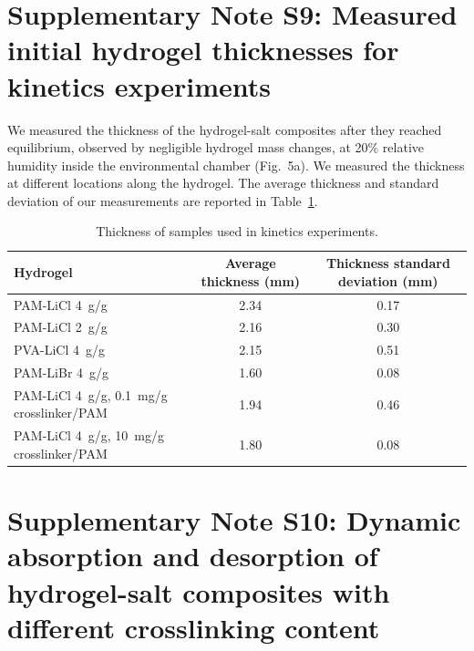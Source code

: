 \documentclass[11pt]{article}
\begin{document}
\clearpage

\section*{Supplementary Note S9: Measured initial hydrogel thicknesses for kinetics experiments}

We measured the thickness of the hydrogel-salt composites after they reached equilibrium, observed by negligible hydrogel mass changes, at 20\% relative humidity inside the environmental chamber (Fig.~5a). We measured the thickness at different locations along the hydrogel. The average thickness and standard deviation of our measurements are reported in Table~\ref{tab:S3}.

\begin{table}[htbp]
\centering
\caption{Thickness of samples used in kinetics experiments.}
\label{tab:S3}
\begin{tabular}{@{}lcc@{}}
\toprule
Hydrogel & Average thickness (mm) & Thickness standard deviation (mm) \\
\midrule
PAM-LiCl 4~g/g & 2.34 & 0.17 \\
PAM-LiCl 2~g/g & 2.16 & 0.30 \\
PVA-LiCl 4~g/g & 2.15 & 0.51 \\
PAM-LiBr 4~g/g & 1.60 & 0.08 \\
PAM-LiCl 4~g/g, 0.1~mg/g crosslinker/PAM & 1.94 & 0.46 \\
PAM-LiCl 4~g/g, 10~mg/g crosslinker/PAM & 1.80 & 0.08 \\
\bottomrule
\end{tabular}
\end{table}

\clearpage

\section*{Supplementary Note S10: Dynamic absorption and desorption of hydrogel-salt composites with different crosslinking content}
\end{document}
